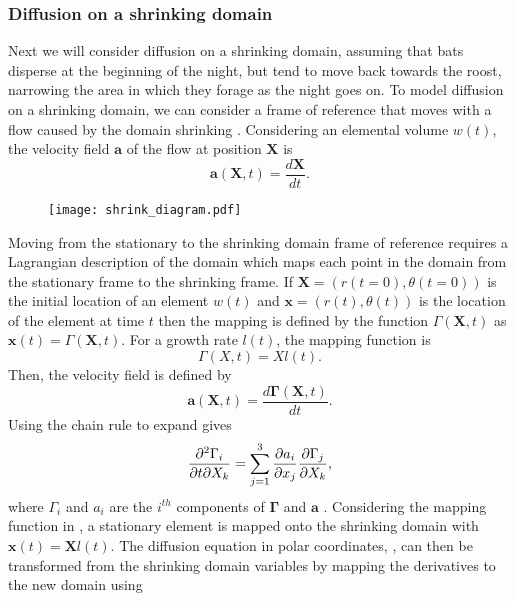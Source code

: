 \subsubsection{Diffusion on a shrinking domain} \label{shrink}
 Next we will consider diffusion on a shrinking domain, assuming that bats disperse at the beginning of the night, but tend to move back towards the roost, narrowing the area in which they forage as the night goes on. To model diffusion on a shrinking domain, we can consider a frame of reference that moves with a flow caused by the domain shrinking \cite{crampin1999reaction}. Considering an elemental volume $w(t)$, the velocity field $\bm{a}$ of the flow at position $\bm{X}$ is
%
\begin{equation}
\bm{a}(\bm{X},t) = \frac{d\bm{X}}{dt}.
\end{equation}
%
\begin{figure} [h]
    \centering
        \texttt{[image: shrink\_diagram.pdf]}
        \caption{}
    \label{fig:shrink_diagram}
\end{figure}
%
Moving from the stationary to the shrinking domain frame of reference requires a Lagrangian description of the domain which maps each point in the domain from the stationary frame to the shrinking frame. If $\bm{X} = (r(t=0),\theta(t=0))$ is the initial location of an element $w(t)$ and $\bm{x} = (r(t),\theta(t))$ is the location of the element at time $t$ then the mapping is defined by the function $\Gamma(\bm{X},t) $ as $\bm{x}(t) =\Gamma(\bm{X},t) $. For a growth rate $l(t)$, the mapping function is
%
\begin{equation}
\Gamma(X,t) = Xl(t).
\label{eqn:mapping}
\end{equation}
%
Then, the velocity field is defined by
%
\begin{equation}
\bm{a}(\bm{X},t) = \frac{d\bm{\Gamma}(\bm{X},t)}{dt} .
\label{dgammadt}
\end{equation}
%
Using the chain rule to expand  gives
%
\begin{equation}
    \frac{\partial^2 \Gamma_i}{\partial t\partial X_k} = \sum_{j=1}^{3}\frac{\partial a_i}{\partial x_j}\frac{\partial \Gamma_j}{\partial X_k},
\end{equation}
%
where $\Gamma_i$ and $a_i$ are the $i^{th}$ components of $\bm{\Gamma}$ and $\bm{a}$ \cite{crampinnonuniform}.
Considering the mapping function in , a stationary element is mapped onto the shrinking domain with $\bm{x}(t) = \bm{X}l(t)$. The diffusion equation in polar coordinates, , can then be transformed from the shrinking domain variables by mapping the derivatives to the new domain using
